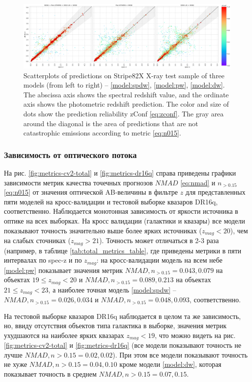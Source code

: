 \documentclass[fleqn,usenatbib]{mnras}
\begin{document}
\begin{figure}
    \centering
    \includegraphics[width=0.99\linewidth]{images/scatterplots-stripe82x-sorted.png}
    \caption{Scatterplots of predictions on Stripe82X X-ray test sample of three models (from left to right) -- \ref{model:spdw}, \ref{model:pw}, \ref{model:dw}. The abscissa axis shows the spectral redshift value, and the ordinate axis shows the photometric redshift prediction. The color and size of dots show the prediction reliability zConf \eqref{eq:zconf}. The gray area around the diagonal is the area of predictions that are not catastrophic emissions according to metric \eqref{eq:n015}.}
    \label{fig:scatter-s82x}
\end{figure}


\subsubsection{Зависимость от оптического потока}\label{ssec:accuracy-as-fzmag}
На рис. \ref{fig:metrics-cv2-total} и \ref{fig:metrics-dr16q} справа приведены графики зависимости метрик качества точечных прогнозов $NMAD$ \eqref{eq:nmad} и $n_{>0.15}$ \eqref{eq:n015} от значения оптической AB-величины в фильтре $z$ для представленных пяти моделей на кросс-валидации и тестовой выборке квазаров DR16q, соответственно. Наблюдается монотонная зависимость от яркости источника в оптике на всех выборках. На кросс валидации (галактики и квазары) все модели показывают точность значительно выше более ярких источниках ($z_{mag} < 20$), чем на слабых сточниках ($z_{mag} > 21$). Точность может отличаться в 2-3 раза (например, в таблице \ref{tab:total_metrics_table}, где приведены метрики в пяти интервалах по spec-z и по $z_{mag}$: на кросс-валидации модель на всем небе \ref{model:pw} показывает значения метрик $NMAD, n_{>0.15} = 0.043, 0.079$ на объектах $19 \leq z_{mag} < 20$ и $NMAD, n_{>0.15} = 0.089, 0.213$ на объектах $21 \leq z_{mag} < 23$, а наиболее точная модель \ref{model:spdw} -- $NMAD, n_{>0.15} = 0.026, 0.034$ и $NMAD, n_{>0.15} = 0.048, 0.093$, соответственно.

На тестовой выборке квазаров DR16q наблюдается в целом та же зависимость, но, ввиду отсутствия объектов типа галактика в выборке, значения метрик ухудшаются на наиболее ярких квазарах $z_{mag} < 19$, что можно видеть на рис. \ref{fig:metrics-cv2-total} и \ref{fig:metrics-dr16q} (все модели показывают точность не лучше $NMAD, n>0.15 = 0.02, 0.02$). При этом все модели показывают точность не хуже $NMAD, n>0.15 = 0.04, 0.10$ кроме модели \ref{model:dw}, которая показывает точность в среднем $NMAD, n>0.15 = 0.07, 0.15$.
\end{document}
